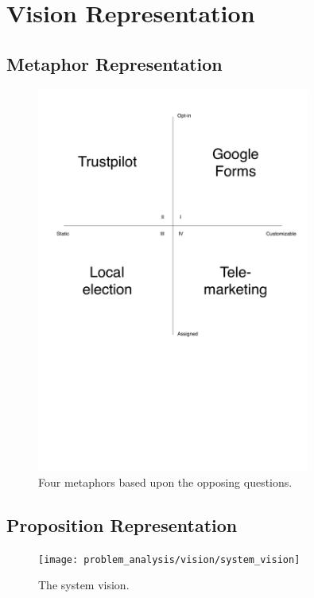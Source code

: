 \section{Vision Representation}

\subsection{Metaphor Representation}

\begin{figure}[!htbp]
	\centering
	\includegraphics[width=0.8\textwidth]{graphic/problem_analysis/vision/metaphor.pdf}
	\caption{Four metaphors based upon the opposing questions.}
	\label{fig:metaphor}
\end{figure}
\FloatBarrier

\subsection{Proposition Representation}
\begin{figure}[!htbp]
    \centering
    \texttt{[image: problem\_analysis/vision/system\_vision]}
    \caption{The system vision.}
    \label{fig:system_vision}
\end{figure}
\FloatBarrier